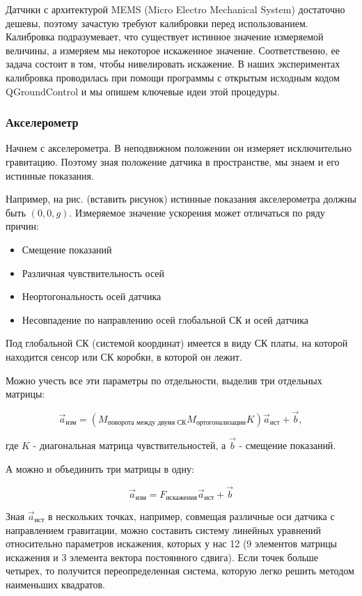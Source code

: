 \documentclass[12pt,a4paper]{article}
\begin{document}
Датчики с архитектурой MEMS (Micro Electro Mechanical System) достаточно дешевы, поэтому зачастую требуют калибровки перед использованием. Калибровка подразумевает, что существует истинное значение измеряемой величины, а измеряем мы некоторое искаженное значение. Соответственно, ее задача состоит в том, чтобы нивелировать искажение. В наших экспериментах калибровка проводилась при помощи программы с открытым исходным кодом QGroundControl и мы опишем ключевые идеи этой процедуры.

\subsubsection{Акселерометр}

Начнем с акселерометра. В неподвижном положении он измеряет исключительно гравитацию. Поэтому зная положение датчика в пространстве, мы знаем и его истинные показания.

Например, на рис. (вставить рисунок) истинные показания акселерометра должны быть $(0, 0, g)$. Измеряемое значение ускорения может отличаться по ряду причин:

\begin{itemize}
	\item Смещение показаний
	\item Различная чувствительность осей
	\item Неортогональность осей датчика
	\item Несовпадение по направлению осей глобальной СК и осей датчика
\end{itemize}

Под глобальной СК (системой координат) имеется в виду СК платы, на которой находится сенсор или СК коробки, в которой он лежит.

Можно учесть все эти параметры по отдельности, выделив три отдельных матрицы:

$$ \vec{a}_{\text{изм}} = \left(M_{\text{поворота между двумя СК}} M_{\text{ортогонализации}} K \right) \vec{a}_{\text{ист}} + \vec{b},$$

где $K$ - диагональная матрица чувствительностей, а $\vec{b}$ - смещение показаний.

А можно и объединить три матрицы в одну:

$$ \vec{a}_{\text{изм}} = F_{\text{искажения}}\vec{a}_{\text{ист}} + \vec{b} $$

Зная $\vec{a}_{\text{ист}}$ в нескольких точках, например, совмещая различные оси датчика с направлением гравитации, можно составить систему линейных уравнений относительно параметров искажения, которых у нас 12 (9 элементов матрицы искажения и 3 элемента вектора постоянного сдвига). Если точек больше четырех, то получится переопределенная система, которую легко решить методом наименьших квадратов.
\end{document}
